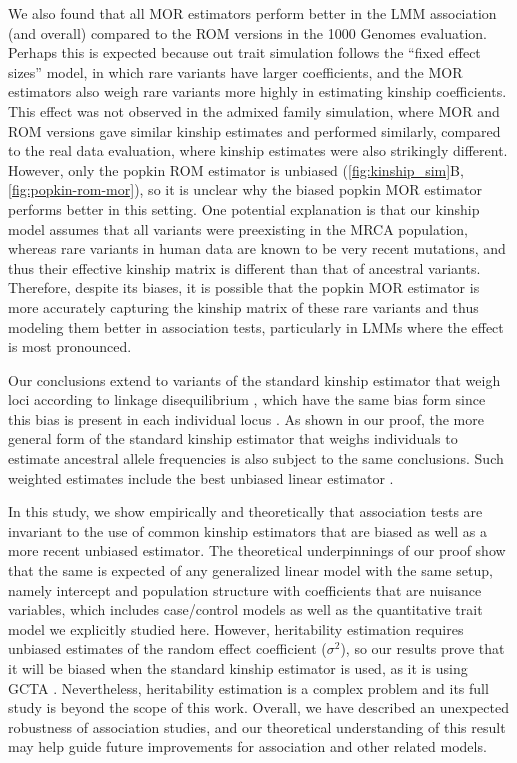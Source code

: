 \documentclass[11pt]{article}
\begin{document}
We also found that all MOR estimators perform better in the LMM association (and overall) compared to the ROM versions in the 1000 Genomes evaluation.
Perhaps this is expected because out trait simulation follows the ``fixed effect sizes'' model, in which rare variants have larger coefficients, and the MOR estimators also weigh rare variants more highly in estimating kinship coefficients.
This effect was not observed in the admixed family simulation, where MOR and ROM versions gave similar kinship estimates and performed similarly, compared to the real data evaluation, where kinship estimates were also strikingly different.
However, only the popkin ROM estimator is unbiased (\cref{fig:kinship_sim}B, \cref{fig:popkin-rom-mor}), so it is unclear why the biased popkin MOR estimator performs better in this setting.
One potential explanation is that our kinship model assumes that all variants were preexisting in the MRCA population, whereas rare variants in human data are known to be very recent mutations, and thus their effective kinship matrix is different than that of ancestral variants.
Therefore, despite its biases, it is possible that the popkin MOR estimator is more accurately capturing the kinship matrix of these rare variants and thus modeling them better in association tests, particularly in LMMs where the effect is most pronounced.

Our conclusions extend to variants of the standard kinship estimator that weigh loci according to linkage disequilibrium \citep{speed_reevaluation_2017, wang_efficient_2017}, which have the same bias form since this bias is present in each individual locus \citep{ochoa_estimating_2021}.
As shown in our proof, the more general form of the standard kinship estimator that weighs individuals to estimate ancestral allele frequencies \pith is also subject to the same conclusions.
Such weighted \pith estimates include the best unbiased linear estimator \citep{astle_population_2009, thornton_roadtrips:_2010}.

In this study, we show empirically and theoretically that association tests are invariant to the use of common kinship estimators that are biased as well as a more recent unbiased estimator.
The theoretical underpinnings of our proof show that the same is expected of any generalized linear model with the same setup, namely intercept and population structure with coefficients that are nuisance variables, which includes case/control models as well as the quantitative trait model we explicitly studied here.
However, heritability estimation requires unbiased estimates of the random effect coefficient ($\sigma^2$), so our results prove that it will be biased when the standard kinship estimator is used, as it is using GCTA \citep{yang_gcta:_2011, yang_advantages_2014}.
Nevertheless, heritability estimation is a complex problem and its full study is beyond the scope of this work.
Overall, we have described an unexpected robustness of association studies, and our theoretical understanding of this result may help guide future improvements for association and other related models.
\end{document}
